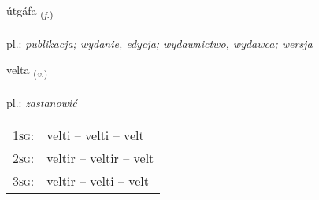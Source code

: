 \documentclass[frontgrid, backgrid]{flacards}\usepackage[]{graphicx}\usepackage[]{xcolor}
\begin{document}
\renewcommand{\flhead}{\vskip5pt \fboxsep=0pt {\small\bfseries\footnotesize Nafnorð | rzeczownik}}
\renewcommand{\fcfoot}{\vskip5pt \fboxsep=0pt \hspace{2pt}{\small\bfseries\footnotesize 1K}}

\renewcommand{\blhead}{\vskip5pt {\small\bfseries\footnotesize Nafnorð | rzeczownik }}
\renewcommand{\bcfoot}{\vskip5pt \hspace{2pt}{\small\bfseries\footnotesize 1K}}


{útgáfa \small{\textsubscript{(\textit{f.})}} \\[1ex] %
\textphonetic{[uːtkauva]} \\
pl.: \emph{publikacja; wydanie, edycja; wydawnictwo, wydawca; wersja} \\  [2ex]
\renewcommand*{\arraystretch}{0.8}
}

\renewcommand{\flhead}{\vskip5pt \fboxsep=0pt {\small\bfseries\footnotesize Sagnorð | czasownik}}
\renewcommand{\fcfoot}{\vskip5pt \fboxsep=0pt \hspace{2pt}{\small\bfseries\footnotesize 1K}}

\renewcommand{\blhead}{\vskip5pt {\small\bfseries\footnotesize Sagnorð | czasownik }}
\renewcommand{\bcfoot}{\vskip5pt \hspace{2pt}{\small\bfseries\footnotesize 1K}}


{velta \small{\textsubscript{(\textit{v.})}} \\[1ex] %
\textphonetic{[vɛl̥ta]} \\
pl.: \emph{zastanowić} \\  [2ex]
\renewcommand*{\arraystretch}{0.8}
\begin{tabular}{p{1cm}l}
\textsc{1sg}: & velti -- velti -- velt \\ 
\textsc{2sg}: & veltir -- veltir -- velt \\ 
\textsc{3sg}: & veltir -- velti -- velt \\ 
\end{tabular}
}
\end{document}

